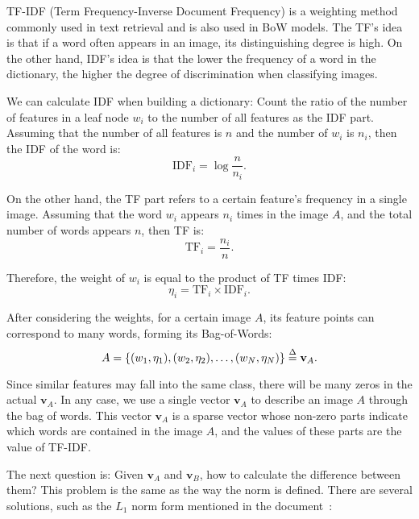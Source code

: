 TF-IDF (Term Frequency-Inverse Document Frequency) {\cite{Sivic2003, Robertson2004}} is a weighting method commonly used in text retrieval and is also used in BoW models. The TF's idea is that if a word often appears in an image, its distinguishing degree is high. On the other hand, IDF's idea is that the lower the frequency of a word in the dictionary, the higher the degree of discrimination when classifying images.

We can calculate IDF when building a dictionary: Count the ratio of the number of features in a leaf node $w_i$ to the number of all features as the IDF part. Assuming that the number of all features is $n$ and the number of $w_i$ is $n_i$, then the IDF of the word is:
\begin{equation}
	\mathrm{IDF}_i = \log \frac{n}{n_i}.
\end{equation}

On the other hand, the TF part refers to a certain feature's frequency in a single image. Assuming that the word $w_i$ appears $n_i$ times in the image $A$, and the total number of words appears $n$, then TF is:
\begin{equation}
	\mathrm{TF}_i = \frac{n_i}{n}.
\end{equation}

Therefore, the weight of $w_i$ is equal to the product of TF times IDF:
\begin{equation}
	\eta_i = \mathrm{TF}_i \times \mathrm{IDF}_i.
\end{equation}

After considering the weights, for a certain image $A$, its feature points can correspond to many words, forming its Bag-of-Words:
\begin{equation}
	A = \left\{ (w_1, \eta_1), (w_2, \eta_2), \ldots, (w_N, \eta_N)  \right\} \buildrel \Delta \over = \mathbf{v}_A.
\end{equation}

Since similar features may fall into the same class, there will be many zeros in the actual $\mathbf{v}_A$. In any case, we use a single vector $\mathbf{v}_A$ to describe an image $A$ through the bag of words. This vector $\mathbf{v}_A$ is a sparse vector whose non-zero parts indicate which words are contained in the image $A$, and the values of these parts are the value of TF-IDF.

The next question is: Given $\mathbf{v}_A$ and $\mathbf{v}_B$, how to calculate the difference between them? This problem is the same as the way the norm is defined. There are several solutions, such as the $L_1$ norm form mentioned in the document~\cite{Nister2006}:


